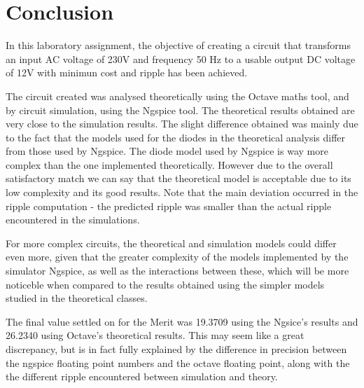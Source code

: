 \section{Conclusion}
\label{sec:conclusion}

In this laboratory assignment, the objective of creating a circuit that transforms an input AC voltage of 230V and frequency 50 Hz to a usable output DC voltage of 12V with minimun cost and ripple has been achieved.\par
The circuit created was analysed theoretically using the Octave maths tool, and by circuit simulation, using the
Ngspice tool. The theoretical results obtained are very close to the simulation results. The slight difference obtained was mainly due to the fact that the models used for the diodes in the theoretical analysis differ from those used by Ngspice. The diode model used by Ngspice is way more complex than the one implemented theoretically. However due to the overall satisfactory match we can say that the theoretical model is acceptable due to its low complexity and its good results. Note that the main deviation occurred in the ripple computation - the predicted ripple was smaller than the actual ripple encountered in the simulations.\par
 For more complex circuits, the
theoretical and simulation models could differ even more, given that the greater complexity of the models implemented by the simulator Ngspice, as well as the interactions between these, which will be more noticeble when compared to the results obtained using the simpler models studied in the theoretical classes.\par
The final value settled on for the Merit was 19.3709 using the Ngsice's results and 26.2340 using Octave's theoretical results. This may seem like a great discrepancy, but is in fact fully explained by the difference in precision between the ngspice floating point numbers and the octave floating point, along with the the different ripple encountered between simulation and theory.


